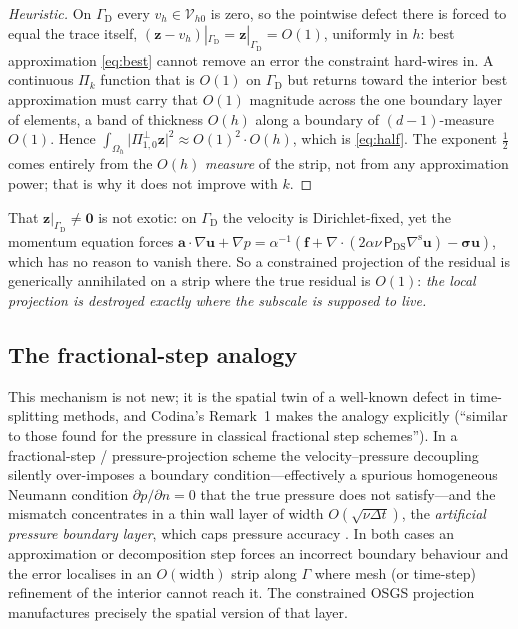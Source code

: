 \documentclass[11pt]{article}
\newcommand{\ViscProj}{\mathsf{P}_{\mathrm{DS}}}
\newcommand{\bu}{\boldsymbol{u}}
\newcommand{\bef}{\boldsymbol{f}}
\newcommand{\bsig}{\boldsymbol{\sigma}}
\newcommand{\ba}{\boldsymbol{a}}
\newcommand{\bz}{\boldsymbol{z}}
\newcommand{\bzero}{\boldsymbol{0}}
\newcommand{\grad}{\nabla}
\newcommand{\divg}{\nabla\!\cdot\!}
\newcommand{\Vhz}{\mathcal{V}_{h0}}
\newcommand{\Ponez}{\Pi_{1,0}}
\theoremstyle{plain}
\theoremstyle{definition}
\theoremstyle{remark}
\begin{document}
\begin{proof}[Heuristic]
On $\Gamma_{\mathrm D}$ every $v_h\in\Vhz$ is zero, so the pointwise
defect there is forced to equal the trace itself,
$(\bz-v_h)|_{\Gamma_{\mathrm D}}=\bz|_{\Gamma_{\mathrm D}}=O(1)$,
uniformly in $h$: best approximation \cref{eq:best} cannot remove an
error the constraint hard-wires in. A continuous $\Pi_k$ function that
is $O(1)$ on $\Gamma_{\mathrm D}$ but returns toward the interior best
approximation must carry that $O(1)$ magnitude across the one boundary
layer of elements, a band of thickness $O(h)$ along a boundary of
$(d\!-\!1)$-measure $O(1)$. Hence
$\int_{\Omega_h}\lvert\Ponez^{\perp}\bz\rvert^2 \approx O(1)^2\cdot O(h)$,
which is \cref{eq:half}. The exponent $\tfrac12$ comes entirely from the
$O(h)$ \emph{measure} of the strip, not from any approximation power;
that is why it does not improve with $k$.
\end{proof}

That $\bz|_{\Gamma_{\mathrm D}}\neq\bzero$ is not exotic: on
$\Gamma_{\mathrm D}$ the velocity is Dirichlet-fixed, yet the momentum
equation forces
$\ba\cdot\grad\bu+\grad p=\alpha^{-1}(\bef+\divg(2\alpha\nu\,\ViscProj\grad^{\mathrm s}\bu)-\bsig\bu)$,
which has no reason to vanish there. So a constrained projection of the
residual is generically annihilated on a strip where the true residual
is $O(1)$: \emph{the local projection is destroyed exactly where the
subscale is supposed to live.}

\subsection{The fractional-step analogy}

This mechanism is not new; it is the spatial twin of a well-known defect
in time-splitting methods, and Codina's Remark~1 makes the analogy
explicitly (``similar to those found for the pressure in classical
fractional step schemes''). In a fractional-step / pressure-projection
scheme the velocity--pressure decoupling silently over-imposes a
boundary condition---effectively a spurious homogeneous Neumann
condition $\partial p/\partial n=0$ that the true pressure does not
satisfy---and the mismatch concentrates in a thin wall layer of width
$O(\sqrt{\nu\Delta t})$, the \emph{artificial pressure boundary layer},
which caps pressure accuracy \cite{guermond2006,codina2001pressure}. In
both cases an approximation or decomposition step forces an incorrect
boundary behaviour and the error localises in an $O(\text{width})$ strip
along $\Gamma$ where mesh (or time-step) refinement of the interior
cannot reach it. The constrained OSGS projection manufactures precisely
the spatial version of that layer.
\end{document}
